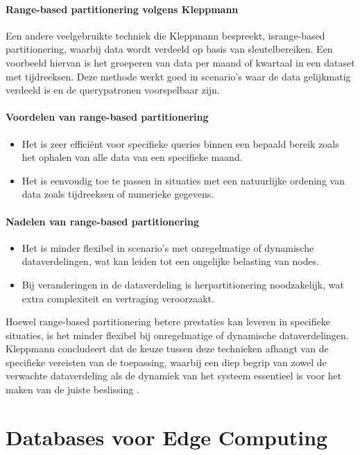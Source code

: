 \paragraph{Range-based partitionering volgens Kleppmann}  
Een andere veelgebruikte techniek die Kleppmann bespreekt, isrange-based partitionering, waarbij data wordt verdeeld op basis van sleutelbereiken. Een voorbeeld hiervan is het groeperen van data per maand of kwartaal in een dataset met tijdreeksen. Deze methode werkt goed in scenario's waar de data gelijkmatig verdeeld is en de querypatronen voorspelbaar zijn.
 
\paragraph{Voordelen van range-based partitionering}  
\begin{itemize}
    \item Het is zeer efficiënt voor specifieke queries binnen een bepaald bereik zoals het ophalen van alle data van een specifieke maand.  
    \item Het is eenvoudig toe te passen in situaties met een natuurlijke ordening van data zoals tijdreeksen of numerieke gegevens.  
\end{itemize}
 
\paragraph{Nadelen van range-based partitionering}  
\begin{itemize}
    \item Het is minder flexibel in scenario's met onregelmatige of dynamische dataverdelingen, wat kan leiden tot een ongelijke belasting van nodes.  
    \item Bij veranderingen in de dataverdeling is herpartitionering noodzakelijk, wat extra complexiteit en vertraging veroorzaakt.  
\end{itemize}
 
Hoewel range-based partitionering betere prestaties kan leveren in specifieke situaties, is het minder flexibel bij onregelmatige of dynamische dataverdelingen. Kleppmann concludeert dat de keuze tussen deze technieken afhangt van de specifieke vereisten van de toepassing, waarbij een diep begrip van zowel de verwachte dataverdeling als de dynamiek van het systeem essentieel is voor het maken van de juiste beslissing \autocite{Kleppmann2017}.

\section{Databases voor Edge Computing}

